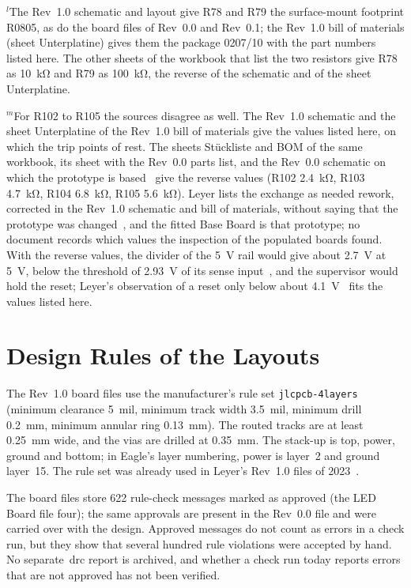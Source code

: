 {$^{l}$The Rev~1.0 schematic and layout give R78 and R79 the surface-mount footprint R0805, as do the board files of Rev~0.0 and Rev~0.1; the Rev~1.0 bill of materials (sheet Unterplatine) gives them the package 0207/10 with the part numbers listed here. The other sheets of the workbook that list the two resistors give R78 as \SI{10}{\kilo\ohm} and R79 as \SI{100}{\kilo\ohm}, the reverse of the schematic and of the sheet Unterplatine.\par
$^{m}$For R102 to R105 the sources disagree as well. The Rev~1.0 schematic and the sheet Unterplatine of the Rev~1.0 bill of materials give the values listed here, on which the trip points of  rest. The sheets Stückliste and BOM of the same workbook, its sheet with the Rev~0.0 parts list, and the Rev~0.0 schematic on which the prototype is based~\cite[Sec.~9.1]{leyer2023} give the reverse values (R102 \SI{2.4}{\kilo\ohm}, R103 \SI{4.7}{\kilo\ohm}, R104 \SI{6.8}{\kilo\ohm}, R105 \SI{5.6}{\kilo\ohm}). Leyer lists the exchange as needed rework, corrected in the Rev~1.0 schematic and bill of materials, without saying that the prototype was changed~\cite[Sec.~9.2]{leyer2023}, and the fitted Base Board is that prototype; no document records which values the inspection of the populated boards found. With the reverse values, the divider of the \SI{5}{\volt} rail would give about \SI{2.7}{\volt} at \SI{5}{\volt}, below the threshold of \SI{2.93}{\volt} of its sense input~\cite[p.~2]{ti_tps3307}, and the supervisor would hold the reset; Leyer's observation of a reset only below about \SI{4.1}{\volt}~\cite[Sec.~4.7]{leyer2023} fits the values listed here.\par}
\endgroup

\section{Design Rules of the Layouts}
\label{sec:app_drc}

The Rev~1.0 board files use the manufacturer's rule set \texttt{jlcpcb-4layers} (minimum clearance \SI{5}{mil}, minimum track width \SI{3.5}{mil}, minimum drill \SI{0.2}{\milli\metre}, minimum annular ring \SI{0.13}{\milli\metre}). The routed tracks are at least \SI{0.25}{\milli\metre} wide, and the vias are drilled at \SI{0.35}{\milli\metre}. The stack-up is top, power, ground and bottom; in Eagle's layer numbering, power is layer~2 and ground layer~15. The rule set was already used in Leyer's Rev~1.0 files of 2023~\cite{leyer2023}.

The board files store 622 rule-check messages marked as approved (the LED Board file four); the same approvals are present in the Rev~0.0 file and were carried over with the design. Approved messages do not count as errors in a check run, but they show that several hundred rule violations were accepted by hand. No separate~\gls{drc} report is archived, and whether a check run today reports errors that are not approved has not been verified.
